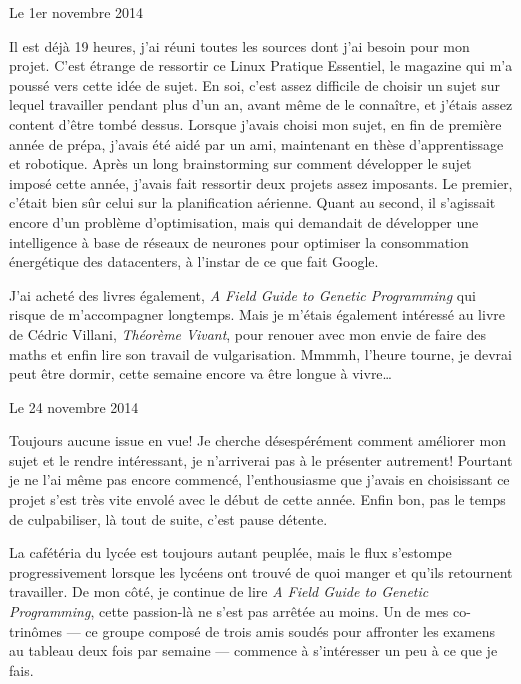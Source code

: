 \documentclass[12pt,final]{report} %
\newcommand{\datemarge}[1]{%
   \newpage
   
        {\hfill{\color{blue}#1}}

}
\begin{document}
\begin{cursive}
{\datemarge{Le 1er novembre 2014}

Il est déjà 19 heures, j'ai réuni toutes les sources dont j'ai besoin pour mon projet. 
C'est étrange de ressortir ce Linux Pratique Essentiel, le magazine qui m'a poussé vers cette idée de sujet. 
En soi, c'est assez difficile de choisir un sujet sur lequel travailler pendant plus d'un an, avant même de le connaître,
et j'étais assez content d'être tombé dessus.
Lorsque j'avais choisi mon sujet, en fin de première année de prépa, j'avais été aidé par un ami, maintenant en thèse d'apprentissage et robotique.
Après un long brainstorming sur comment développer le sujet imposé cette année, j'avais fait ressortir deux projets assez imposants.
Le premier, c'était bien sûr celui sur la planification aérienne. 
Quant au second, il s'agissait encore d'un problème d'optimisation, mais qui demandait de développer une intelligence à base de réseaux de neurones pour optimiser la consommation énergétique des datacenters, à l'instar de ce que fait Google.

J'ai acheté des livres également, \textsl{A Field Guide to Genetic Programming} qui risque de m'accompagner longtemps.
Mais je m'étais également intéressé au livre de Cédric Villani, \textsl{Théorème Vivant}, pour renouer avec mon envie de faire des maths et enfin lire son travail de vulgarisation. 
Mmmmh, l'heure tourne, je devrai peut être dormir, cette semaine encore va être longue à vivre\dots

\datemarge{Le 24 novembre 2014}

Toujours aucune issue en vue!
Je cherche désespérément comment améliorer mon sujet et le rendre intéressant, je n'arriverai pas à le présenter autrement!
Pourtant je ne l'ai même pas encore commencé, l'enthousiasme que j'avais en choisissant ce projet s'est très vite envolé avec le début de cette année.
Enfin bon, pas le temps de culpabiliser, là tout de suite, c'est pause détente. 

La cafétéria du lycée est toujours autant peuplée, mais le flux s'estompe progressivement lorsque les lycéens ont trouvé de quoi manger et qu'ils retournent travailler. 
De mon côté, je continue de lire \textsl{A Field Guide to Genetic Programming}, cette passion-là ne s'est pas arrêtée au moins.
Un de mes co-trinômes --- ce groupe composé de trois amis soudés pour affronter les examens au tableau deux fois par semaine --- commence à s'intéresser un peu à ce que je fais.

}
\end{cursive}
\end{document}
